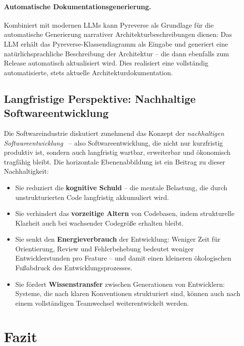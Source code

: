 ﻿\documentclass[a4paper,12pt]{article}
\begin{document}
\paragraph{Automatische Dokumentationsgenerierung.}
Kombiniert mit modernen LLMs kann Pyreverse als Grundlage für die automatische
Generierung narrativer Architekturbeschreibungen dienen: Das LLM erhält das
Pyreverse-Klassendiagramm als Eingabe und generiert eine natürlichsprachliche
Beschreibung der Architektur -- die dann ebenfalls zum Release automatisch
aktualisiert wird. Dies realisiert eine vollständig automatisierte,
stets aktuelle Architekturdokumentation.

\subsection{Langfristige Perspektive: Nachhaltige Softwareentwicklung}

Die Softwareindustrie diskutiert zunehmend das Konzept der \textit{nachhaltigen
	Softwareentwicklung}~\cite{naumann2011} -- also Softwareentwicklung, die nicht
nur kurzfristig produktiv ist, sondern auch langfristig wartbar, erweiterbar und
ökonomisch tragfähig bleibt. Die horizontale Ebenenabbildung ist ein Beitrag
zu dieser Nachhaltigkeit:

\begin{itemize}[leftmargin=*]
	\item Sie reduziert die \textbf{kognitive Schuld} -- die mentale Belastung,
	die durch unstrukturierten Code langfristig akkumuliert wird.
	\item Sie verhindert das \textbf{vorzeitige Altern} von Codebasen, indem
	strukturelle Klarheit auch bei wachsender Codegröße erhalten bleibt.
	\item Sie senkt den \textbf{Energieverbrauch} der Entwicklung: Weniger Zeit
	für Orientierung, Review und Fehlerbehebung bedeutet weniger
	Entwicklerstunden pro Feature -- und damit einen kleineren
	ökologischen Fußabdruck des Entwicklungsprozesses.
	\item Sie fördert \textbf{Wissenstransfer} zwischen Generationen von
	Entwicklern: Systeme, die nach klaren Konventionen strukturiert sind,
	können auch nach einem vollständigen Teamwechsel weiterentwickelt werden.
\end{itemize}

\section{Fazit}
\end{document}
